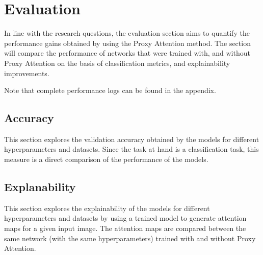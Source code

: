 
\chapter{Evaluation}
In line with the research questions, the evaluation section aims to quantify the performance gains obtained by using the Proxy Attention method. The section will compare the performance of networks that were trained with, and without Proxy Attention on the basis of classification metrics, and explainability improvements. 

Note that complete performance logs can be found in the appendix.
\section{Accuracy}
This section explores the validation accuracy obtained by the models for different hyperparameters and datasets. Since the task at hand is a classification task, this measure is a direct comparison of the performance of the models.

\section{Explanability}
This section explores the explainability of the models for different hyperparameters and datasets by using a trained model to generate attention maps for a given input image. The attention maps are compared between the same network (with the same hyperparameters) trained with and without Proxy Attention.



